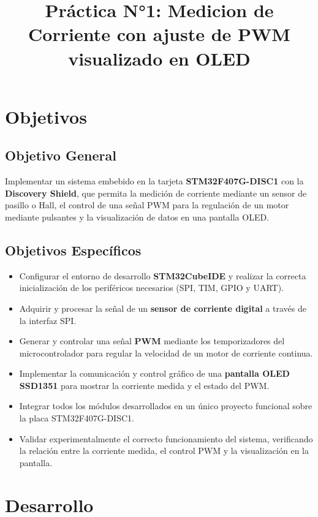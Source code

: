 \documentclass[a4paper,12pt]{article}
\title{Práctica N°1: Medicion de Corriente con ajuste de PWM visualizado en OLED}
\date{}
\begin{document}
\maketitle
\tableofcontents
\newpage


\section{Objetivos}

\subsection*{Objetivo General}
Implementar un sistema embebido en la tarjeta \textbf{STM32F407G-DISC1} con la \textbf{Discovery Shield}, que permita la medición de corriente mediante un sensor de pasillo o Hall, el control de una señal PWM para la regulación de un motor mediante pulsantes y la visualización de datos en una pantalla OLED.

\subsection*{Objetivos Específicos}
\begin{itemize}
    \item Configurar el entorno de desarrollo \textbf{STM32CubeIDE} y realizar la correcta inicialización de los periféricos necesarios (SPI, TIM, GPIO y UART).
    \item Adquirir y procesar la señal de un \textbf{sensor de corriente digital} a través de la interfaz SPI.
    \item Generar y controlar una señal \textbf{PWM} mediante los temporizadores del microcontrolador para regular la velocidad de un motor de corriente continua.
    \item Implementar la comunicación y control gráfico de una \textbf{pantalla OLED SSD1351} para mostrar la corriente medida y el estado del PWM.
    \item Integrar todos los módulos desarrollados en un único proyecto funcional sobre la placa STM32F407G-DISC1.
    \item Validar experimentalmente el correcto funcionamiento del sistema, verificando la relación entre la corriente medida, el control PWM y la visualización en la pantalla.
\end{itemize}


\section{Desarrollo}
\end{document}
